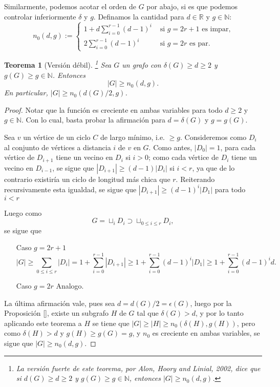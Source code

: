 \documentclass[12pt]{report}
\theoremstyle{plain}
\newtheorem{theorem}{Teorema}[section]
\theoremstyle{definition}
\newcommand{\naturals}{\mathbb{N}}
\newcommand{\reals}{\mathbb{R}}
\newcommand{\abs}[1]{\left \vert #1 \right \vert}
\begin{document}
Similarmente, podemos acotar el orden de $G$ por abajo, si es que podemos controlar inferiormente $\delta$ y $g$. Definamos la cantidad para $d \in \reals$ y $g \in \naturals$:
\[
    n_0(d,g):= \begin{cases}
                1 + d \sum_{i = 0}^{r-1} (d-1)^i & \text{ si $g = 2 r +1$ es impar,}\\
                2 \sum_{i=0}^{r-1} (d-1)^i & \text{ si $g = 2 r$ es par.}
                \end{cases}
\]

\begin{theorem}[Versión débil]\footnote{La versión fuerte de este teorema, por Alon, Hoory and Linial, 2002, dice que
 si $d(G) \geq d \geq 2$ y $g(G) \geq g \in \naturals$, entonces $\abs G \geq n_0 (d,g)$.}
Sea $G$ un grafo con $\delta (G) \geq d \geq 2$ y $g(G) \geq g \in \naturals$. Entonces
\[
    \abs G \geq n_0 (d,g).
\]
En particular, $\abs G \geq n_0 ( d(G)/2, g)$.
\end{theorem}
\begin{proof}
Notar que la función es creciente en ambas variables para todo $d \geq 2$ y $g \in \naturals$. Con lo cual, basta
probar la afirmación para $d = \delta(G)$ y $g = g(G)$.

Sea $v$ un vértice de un ciclo $C$ de largo mínimo, i.e. $\geq g$. Consideremos como $D_i$ al conjunto de vértices a distancia $i$ de $v$ en $G$. Como antes, $\abs {D_0} = 1$, para cada vértice de $D_{i+1}$ tiene un vecino en $D_{i}$ si $i>0$; como cada vértice de $D_i$ tiene un vecino en $D_{i-1}$, se sigue que $\abs{D_{i+1}}  \geq (d-1) \abs{D_i}$ si $i < r$, ya que de lo contrario existiría un ciclo de longitud más chica que $r$.
Reiterando recursivamente esta igualdad, se sigue que $\abs{D_{i+1}} \geq (d-1)^i \abs{D_1}$ para todo $i < r$

Luego como
$$
G = \sqcup_{i} D_i \supset \sqcup_{0\leq i\leq r} D_i,
$$
se sigue que
\begin{enumerate}
\item[Caso $g = 2 r +1$]
$$
\abs G \geq \sum_{0 \leq i \leq r} \abs{D_i} =  1 + \sum_{i=0}^{r-1} \abs{D_{i+1}} \geq 1 + \sum_{i=0}^{r-1} (d-1)^i \abs{D_1} \geq 1 + \sum_{i=0}^{r-1} (d-1)^i d.$$

\item[Caso $g = 2 r$] Analogo.
\end{enumerate}

La última afirmación vale, pues sea $d = d(G)/2 = \epsilon (G)$, luego por la Proposición \ref{}, existe un subgrafo $H$ de $G$ tal que $\delta (G) > d$, y por lo tanto aplicando este teorema a $H$ se tiene que $\abs G \geq \abs H \geq n_0 (\delta(H),g(H))$, pero como $\delta (H) > d$ y $g(H) \geq g(G) = g$, y $n_0$ es creciente en ambas variables, se sigue que $\abs G \geq n_0 (d,g)$.

\end{proof}
\end{document}
